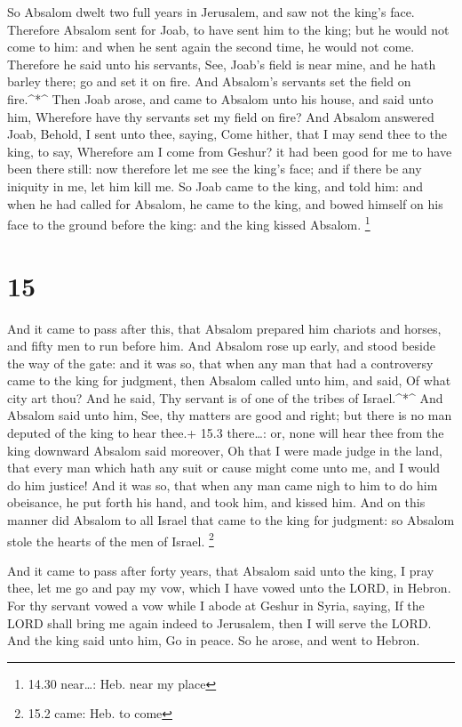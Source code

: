  So Absalom dwelt two full years in Jerusalem, and saw not
the king's face.  Therefore Absalom sent for Joab, to have
sent him to the king; but he would not come to him: and when he sent
again the second time, he would not come.  Therefore he
said unto his servants, See, Joab's field is near mine, and he hath
barley there; go and set it on fire. And Absalom's servants set the
field on fire.\^{}*\^{}  Then Joab arose, and came to
Absalom unto his house, and said unto him, Wherefore have thy servants
set my field on fire?  And Absalom answered Joab, Behold, I
sent unto thee, saying, Come hither, that I may send thee to the king,
to say, Wherefore am I come from Geshur? it had been good for me to have
been there still: now therefore let me see the king's face; and if there
be any iniquity in me, let him kill me.  So Joab came to
the king, and told him: and when he had called for Absalom, he came to
the king, and bowed himself on his face to the ground before the king:
and the king kissed Absalom. \footnote{14.30 near\ldots: Heb. near my
  place}

\hypertarget{section-14}{%
\section{15}\label{section-14}}

 And it came to pass after this, that Absalom prepared him
chariots and horses, and fifty men to run before him.  And
Absalom rose up early, and stood beside the way of the gate: and it was
so, that when any man that had a controversy came to the king for
judgment, then Absalom called unto him, and said, Of what city art thou?
And he said, Thy servant is of one of the tribes of Israel.\^{}*\^{}
 And Absalom said unto him, See, thy matters are good and
right; but there is no man deputed of the king to hear thee.+ 15.3
there\ldots: or, none will hear thee from the king downward 
Absalom said moreover, Oh that I were made judge in the land, that every
man which hath any suit or cause might come unto me, and I would do him
justice!  And it was so, that when any man came nigh to him
to do him obeisance, he put forth his hand, and took him, and kissed
him.  And on this manner did Absalom to all Israel that came
to the king for judgment: so Absalom stole the hearts of the men of
Israel. \footnote{15.2 came: Heb. to come}

 And it came to pass after forty years, that Absalom said
unto the king, I pray thee, let me go and pay my vow, which I have vowed
unto the LORD, in Hebron.  For thy servant vowed a vow while
I abode at Geshur in Syria, saying, If the LORD shall bring me again
indeed to Jerusalem, then I will serve the LORD.  And the
king said unto him, Go in peace. So he arose, and went to Hebron.

